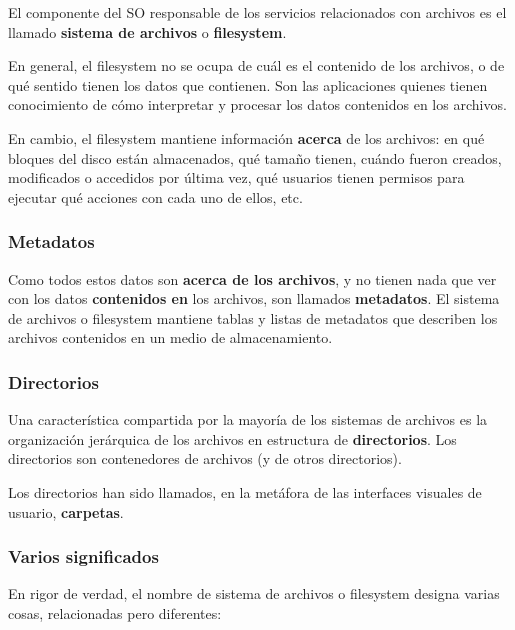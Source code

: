 \documentclass[spanish,A4,]{article}
\begin{document}
El componente del SO responsable de los servicios relacionados con
archivos es el llamado \textbf{sistema de archivos} o
\textbf{filesystem}.

En general, el filesystem no se ocupa de cuál es el contenido de los
archivos, o de qué sentido tienen los datos que contienen. Son las
aplicaciones quienes tienen conocimiento de cómo interpretar y procesar
los datos contenidos en los archivos.

En cambio, el filesystem mantiene información \textbf{acerca} de los
archivos: en qué bloques del disco están almacenados, qué tamaño tienen,
cuándo fueron creados, modificados o accedidos por última vez, qué
usuarios tienen permisos para ejecutar qué acciones con cada uno de
ellos, etc.

\subsubsection{Metadatos}\label{metadatos}

Como todos estos datos son \textbf{acerca de los archivos}, y no tienen
nada que ver con los datos \textbf{contenidos en} los archivos, son
llamados \textbf{metadatos}. El sistema de archivos o filesystem
mantiene tablas y listas de metadatos que describen los archivos
contenidos en un medio de almacenamiento.

\subsubsection{Directorios}\label{directorios}

Una característica compartida por la mayoría de los sistemas de archivos
es la organización jerárquica de los archivos en estructura de
\textbf{directorios}. Los directorios son contenedores de archivos (y de
otros directorios).

Los directorios han sido llamados, en la metáfora de las interfaces
visuales de usuario, \textbf{carpetas}.

\subsubsection{Varios significados}\label{varios-significados}

En rigor de verdad, el nombre de sistema de archivos o filesystem
designa varias cosas, relacionadas pero diferentes:
\end{document}
